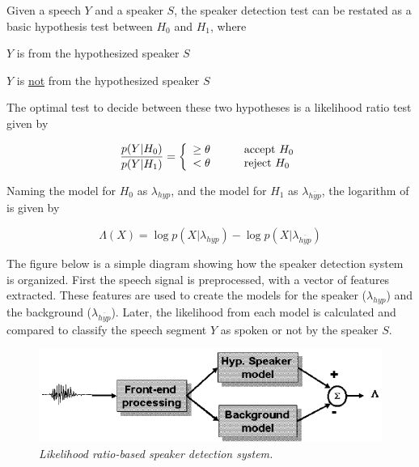 \documentclass[a4paper,twocolumn]{article}
\begin{document}
Given a speech $Y$ and a speaker $S$, the speaker detection test can be restated as a basic hypothesis test between $H_0$ and $H_1$, where

\begin{description}\itemsep 0pt \parskip 1pt
    \item[$H_0$:] $Y$ is from the hypothesized speaker $S$
    \item[$H_1$:] $Y$ is \underline{not} from the hypothesized speaker $S$
\end{description}

\noindent The optimal test to decide between these two hypotheses is a likelihood ratio test given by

\begin{equation}
    \label{eq:likelihood_ratio_test}
    \frac{p(Y|H_0)}{p(Y|H_1)} = \left\{
        \begin{array}{l l}
        \geq \theta \quad\quad\quad \text{accept $H_0$}\\
        < \theta \quad\quad\quad \text{reject $H_0$}
        \end{array} \right.
\end{equation}

\noindent Naming the model for $H_0$ as $\lambda_{hyp}$, and the model for $H_1$ as $\lambda_{\overline{hyp}}$, the logarithm of  is given by

\begin{equation}
    \label{eq:log_likelihood_ratio_test}
    \Lambda(X) = \log p(X|\lambda_{hyp}) - \log p(X|\lambda_{\overline{hyp}})
\end{equation}

The figure below is a simple diagram showing how the speaker detection system is organized. First the speech signal is preprocessed, with a vector of features extracted. These features are used to create the models for the speaker ($\lambda_{hyp}$) and the background ($\lambda_{\overline{hyp}}$). Later, the likelihood from each model is calculated and compared to classify the speech segment $Y$ as spoken or not by the speaker $S$.

\begin{figure}[h]
    \label{fig:speaker_detection_system}
    \centering
    \includegraphics[scale=0.3]{speaker-detection-system}
    \caption{\textit{Likelihood ratio-based speaker detection system.}}
\end{figure}
\end{document}
